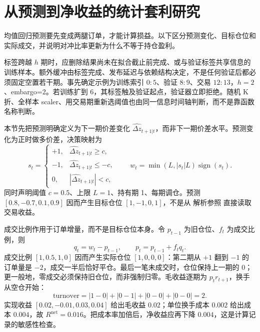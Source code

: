 \section{从预测到净收益的统计套利研究}
\label{ch:lower-stat-arb-research}

\begin{itemize}
  
\end{itemize}

均值回归预测要先变成两腿订单，才能计算损益。以下区分预测变化、目标仓位和实际成交，并说明对冲比率更新为什么不等于持仓盈利。



标签跨越 $h$ 期时，应删除结果尚未在拟合截止前完成、或与验证标签共享信息的训练样本。额外缓冲由标签完成、发布延迟与依赖结构决定，不是任何验证后都必须固定空置若干期。事先确定示例为训练索引 $0{:}5$、验证 $8{:}9$、交易 $12{:}13$，$h=2$、embargo=2。若训练扩到 6，其标签触及验证起点，验证器立即拒绝。随机 K 折、全样本 scaler、用交易期重新选阈值也由同一信息时间轴判断，而不是靠函数名称判断。




本节先把预测明确定义为下一期价差变化 $\widehat{\Delta z}_{t+1|t}$，而非下一期价差水平。预测变化为正时做多价差，决策映射为
\[
s_t=\begin{cases}
+1,&\widehat{\Delta z}_{t+1|t}\ge c,\\
-1,&\widehat{\Delta z}_{t+1|t}\le-c,\\
0,&|\widehat{\Delta z}_{t+1|t}|<c,
\end{cases}
\qquad w_t=\min(L,|s_t|L)\operatorname{sign}(s_t).
\]
同时声明阈值 $c=0.5$、上限 $L=1$、持有期 1、每期调仓。预测 $[0.8,-0.7,0.1,0.9]$ 因而产生目标仓位 $[1,-1,0,1]$，不是从 解析参照 直接读取交易收益。



成交比例作用于订单增量，而不是目标仓位本身。令 $p_{t-1}$ 为旧仓位、$f_t$ 为成交比例，则
\[
q_t=w_t-p_{t-1},\qquad p_t=p_{t-1}+f_tq_t.
\]
成交比例 $[1,0.5,1,0]$ 因而产生实际仓位 $[1,0,0,0]$：第二期从 $+1$ 翻到 $-1$ 的订单量是 $-2$，成交一半后恰好平仓。最后一笔未成交时，仓位保持上一期的 0；更一般地，零成交必须保持旧仓位，而非强制归零。毛收益逐期为 $p_t r_{t+1}$，换手从空仓开始：
\[
\text{turnover}=|1-0|+|0-1|+|0-0|+|0-0|=2.
\]
实现收益 $[0.02,-0.01,0.03,0.04]$ 给出毛收益 $0.02$；单位换手成本 $0.002$ 给出成本 $0.004$，故 $R^{\mathrm{net}}=0.016$。把成本率加倍后，净收益应再下降 $0.004$，这是计算记录的敏感性检查。

